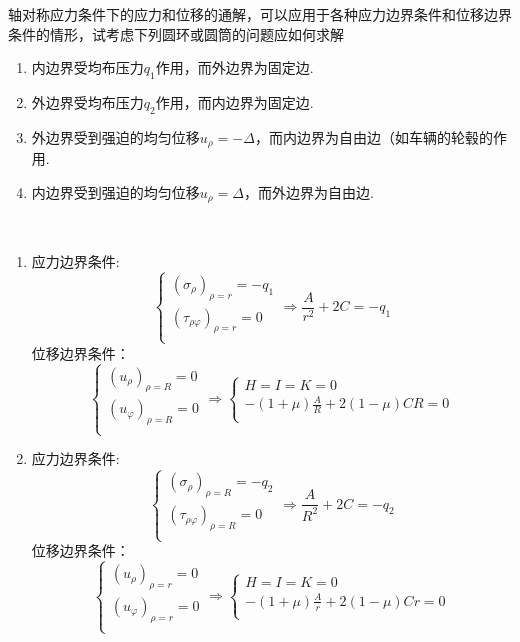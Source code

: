 \begin{example}
轴对称应力条件下的应力和位移的通解，可以应用于各种应力边界条件和位移边界条件的情形，试考虑下列圆环或圆筒的问题应如何求解
\begin{enumerate}
	\item 内边界受均布压力$q_1$作用，而外边界为固定边.
	\item 外边界受均布压力$q_2$作用，而内边界为固定边.
	\item 外边界受到强迫的均匀位移$u_{\rho}=-\varDelta $，而内边界为自由边（如车辆的轮毂的作用.
	\item 内边界受到强迫的均匀位移$u_{\rho}=\varDelta $，而外边界为自由边.
\end{enumerate}
\end{example}
		\begin{remark}
			\quad \\
			\begin{enumerate}
				\item 应力边界条件:\[\begin{cases}
				\left( \sigma _{\rho} \right) _{\rho =r}=-q_1\\
				\left( \tau _{\rho \varphi} \right) _{\rho =r}=0\\
				\end{cases}\Longrightarrow \frac{A}{r ^2}+2C=-q_1\]
				位移边界条件：\[\begin{cases}
				\left( u_{\rho} \right) _{\rho =R}=0\\
				\left( u_{\varphi} \right) _{\rho =R}=0\\
				\end{cases}\Longrightarrow \begin{cases}
				H=I=K=0\\
				-\left( 1+\mu \right) \frac{A}{R}+2\left( 1-\mu \right) CR=0\\
				\end{cases}\]
				
				\item 应力边界条件:\[\begin{cases}
				\left( \sigma _{\rho} \right) _{\rho =R}=-q_2\\
				\left( \tau _{\rho \varphi} \right) _{\rho =R}=0\\
				\end{cases}\Longrightarrow \frac{A}{R^2}+2C=-q_2\]
				位移边界条件：\[\begin{cases}
				\left( u_{\rho} \right) _{\rho =r}=0\\
				\left( u_{\varphi} \right) _{\rho =r}=0\\
				\end{cases}\Longrightarrow \begin{cases}
				H=I=K=0\\
				-\left( 1+\mu \right) \frac{A}{r}+2\left( 1-\mu \right) Cr=0\\
				\end{cases}\]
				

\end{enumerate}
\end{remark}
